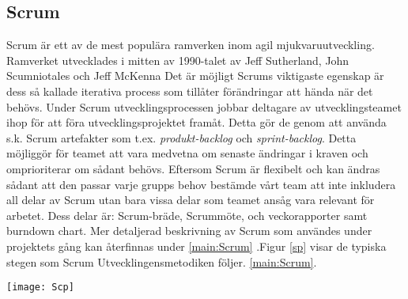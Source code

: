 \subsection{Scrum}
Scrum är ett av de mest populära ramverken inom agil mjukvaruutveckling. Ramverket utvecklades i mitten av 1990-talet av Jeff Sutherland, John Scumniotales och Jeff McKenna Det är möjligt Scrums viktigaste egenskap är dess så kallade iterativa process som tillåter förändringar att hända när det behövs. Under Scrum utvecklingsprocessen jobbar deltagare av utvecklingsteamet ihop för att föra utvecklingsprojektet framåt. Detta gör de genom att använda s.k.  Scrum artefakter som t.ex. \textit{produkt-backlog} och \textit{sprint-backlog}. Detta möjliggör för teamet att vara medvetna om senaste ändringar i kraven och omprioriterar om sådant behövs.  \cite{aamir2017incorporating} Eftersom Scrum är flexibelt och kan ändras sådant att den passar varje grupps behov bestämde vårt team att inte inkludera all delar av Scrum utan bara vissa delar som teamet ansåg vara relevant för arbetet. Dess delar är: Scrum-bräde, Scrummöte, och veckorapporter samt burndown chart. Mer detaljerad beskrivning av Scrum som användes under projektets gång kan återfinnas under \ref{main:Scrum} .Figur \ref{sp} visar de typiska stegen som Scrum Utvecklingensmetodiken följer.
\ref{main:Scrum}.
\begin{figure*}[h]
	\centering
	\texttt{[image: Scp]}
	\caption{De typiska stegen som följs i Scrum\cite{Scrumprocess}}
	\label{sp}
\end{figure*}
